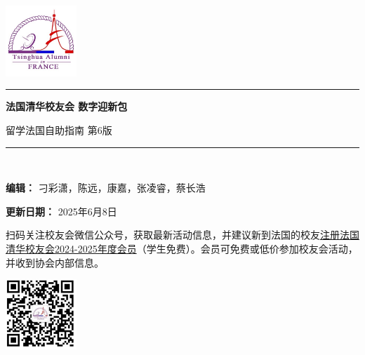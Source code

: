 \documentclass[UTF8]{ctexart}
\newcommand\titleofdoc{\bfseries 法国清华校友会 数字迎新包}
\begin{document}
\begin{titlepage}
   \begin{center}
   
        \vspace{4 cm} 
        
        {\includegraphics[width=0.2\textwidth]{images/Logo.jpg}}\\

        \vspace{0.5 cm} 
        
        \noindent\rule[0.25\baselineskip]{\textwidth}{1pt}
        
        \vspace{0.5 cm} 
        
        \Huge{\titleofdoc} 

        \vspace{0.5cm}
        
        \LARGE{留学法国自助指南 第6版}
        
        \vspace{1 cm} 
        
        \noindent\rule[0.25\baselineskip]{\textwidth}{1pt}\\
        
        \vspace{1 cm}

        \large{\textbf{编辑：} 刁彩潇，陈远，康嘉，张凌睿，蔡长浩}\\

        \vspace{0.3 cm}

        \large{\textbf{更新日期：} 2025年6月8日}\\

        \vspace{1 cm}

        \large{扫码关注校友会微信公众号，获取最新活动信息，并建议新到法国的校友\href{https://www.helloasso.com/associations/association-des-anciens-eleves-de-l-universite-tsi/adhesions/adhesion-2024-2025}{注册法国清华校友会2024-2025年度会员}（学生免费）。会员可免费或低价参加校友会活动，并收到协会内部信息。}
        
        \vspace{0.5 cm} 
        {\includegraphics[width=0.2\textwidth]{images/QRcode.png}}\\


\end{center}
\end{titlepage}
\end{document}
